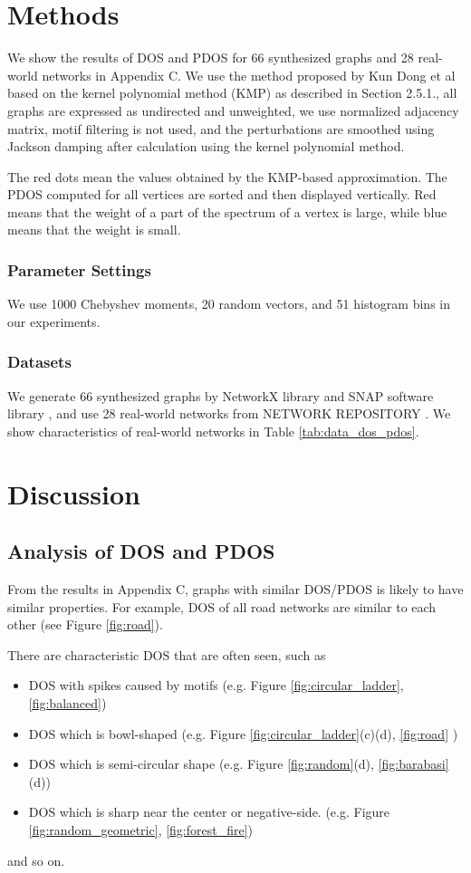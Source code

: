 \documentclass[senior,final,11pt]{iscs-thesis}
\begin{document}
\section{Methods}
We show the results of DOS and PDOS for 66 synthesized graphs and 28 real-world networks in Appendix C. We use the method proposed by Kun Dong et al \cite{dong2019network} based on the kernel polynomial method (KMP) as described in Section 2.5.1., all graphs are expressed as undirected and unweighted, we use normalized adjacency matrix, motif filtering is not used, and the perturbations are smoothed using Jackson damping after calculation using the kernel polynomial method.

The red dots mean the values obtained by the KMP-based approximation. The PDOS computed for all vertices are sorted and then displayed vertically. Red means that the weight of a part of the spectrum of a vertex is large, while blue means that the weight is small.

\subsubsection*{Parameter Settings}
We use 1000 Chebyshev moments, 20 random vectors, and 51 histogram bins in our experiments.

\subsubsection*{Datasets}
We generate 66 synthesized graphs by NetworkX library \cite{SciPyProceedings_11} and SNAP software library \cite{leskovec2016snap}, and use 28 real-world networks from NETWORK REPOSITORY \cite{nr}. We show characteristics of real-world networks in Table \ref{tab:data_dos_pdos}.


\section{Discussion}
\subsection{Analysis of DOS and PDOS}
From the results in Appendix C, graphs with similar DOS/PDOS is likely to have similar properties. For example, DOS of all road networks are similar to each other (see Figure \ref{fig:road}).

There are characteristic DOS that are often seen, such as
\begin{itemize}
  \item DOS with spikes caused by motifs (e.g. Figure \ref{fig:circular_ladder}, \ref{fig:balanced})
  \item DOS which is bowl-shaped (e.g. Figure \ref{fig:circular_ladder}(c)(d), \ref{fig:road} )
  \item DOS which is semi-circular shape (e.g. Figure \ref{fig:random}(d), \ref{fig:barabasi}(d))
  \item DOS which is sharp near the center or negative-side. (e.g. Figure \ref{fig:random_geometric}, \ref{fig:forest_fire})
\end{itemize}
and so on.
\end{document}
